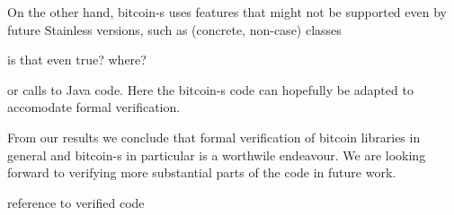 \documentclass[runningheads]{llncs}
\newcommand{\todo}[1]{{\par \color{red}#1}}
\begin{document}
On the other hand, bitcoin-s uses features that might not be supported
even by future Stainless versions, such as (concrete, non-case)
classes \todo{is that even true? where?} or calls to Java code. Here
the bitcoin-s code can hopefully be adapted to accomodate formal
verification.

From our results we conclude that formal verification of bitcoin
libraries in general and bitcoin-s in particular is a worthwile
endeavour. We are looking forward to verifying more substantial parts
of the code in future work.





\todo{reference to verified code}

\clearpage
\appendix
\end{document}
